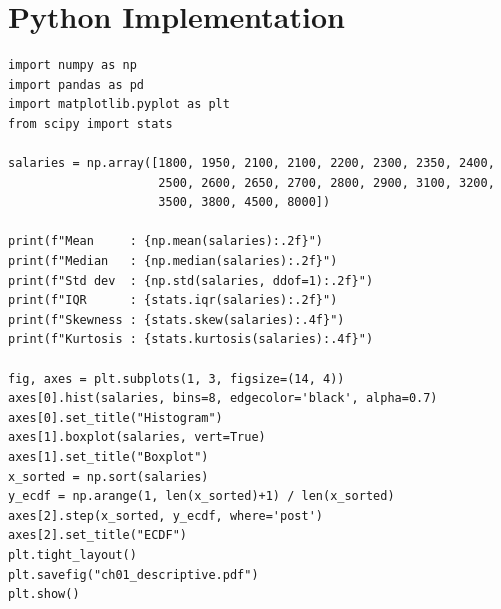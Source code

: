 \begin{center}
\hspace{1cm}
\hspace{1cm}
\end{center}

\section{Python Implementation}

\begin{python}
\begin{verbatim}
import numpy as np
import pandas as pd
import matplotlib.pyplot as plt
from scipy import stats

salaries = np.array([1800, 1950, 2100, 2100, 2200, 2300, 2350, 2400,
                     2500, 2600, 2650, 2700, 2800, 2900, 3100, 3200,
                     3500, 3800, 4500, 8000])

print(f"Mean     : {np.mean(salaries):.2f}")
print(f"Median   : {np.median(salaries):.2f}")
print(f"Std dev  : {np.std(salaries, ddof=1):.2f}")
print(f"IQR      : {stats.iqr(salaries):.2f}")
print(f"Skewness : {stats.skew(salaries):.4f}")
print(f"Kurtosis : {stats.kurtosis(salaries):.4f}")

fig, axes = plt.subplots(1, 3, figsize=(14, 4))
axes[0].hist(salaries, bins=8, edgecolor='black', alpha=0.7)
axes[0].set_title("Histogram")
axes[1].boxplot(salaries, vert=True)
axes[1].set_title("Boxplot")
x_sorted = np.sort(salaries)
y_ecdf = np.arange(1, len(x_sorted)+1) / len(x_sorted)
axes[2].step(x_sorted, y_ecdf, where='post')
axes[2].set_title("ECDF")
plt.tight_layout()
plt.savefig("ch01_descriptive.pdf")
plt.show()
\end{verbatim}
\end{python}

